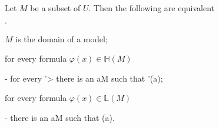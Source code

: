 \documentclass[11pt,oneside]{amsart}
\newcommand{\mylabel}[1]{{#1}\hfill}
\renewenvironment{itemize}
  {\begin{list}{$\cdot$}{%
  \setlength{\parskip}{0mm}
  \setlength{\topsep}{.2\baselineskip}
  \setlength{\rightmargin}{0mm}
  \setlength{\listparindent}{0mm}
  \setlength{\itemindent}{0mm}
  \setlength{\labelwidth}{3ex}
  \setlength{\itemsep}{.2\baselineskip}
  \setlength{\parsep}{.2\baselineskip}
  \setlength{\partopsep}{0mm}
  \setlength{\labelsep}{1ex}
  \setlength{\leftmargin}{\labelwidth+\labelsep}
  \let\makelabel\mylabel}}{%
\end{list}}
\begin{document}
\begin{proposition} 
  Let $M$ be a subset of $U$.
  Then the following are equivalent
  \begin{itemize}
    \item[1.] $M$ is the domain of a model;
    \item[2.] for every formula $\varphi(x)\in\mathds{H}(M)$
    
    \noindent\kern-\leftmargin
    {\textrm{ for every }\varphi'>\varphi\textrm{ there is an }a\in M\textrm{ such that }\varphi'(a);}
    \item[3.] for every formula $\varphi(x)\in\mathds{L}(M)$
    
    \noindent\kern-\leftmargin
    {\textrm{ there is an }a\in M\textrm{ such that }\neg\varphi(a).}
    
  \end{itemize}
\end{proposition}
\end{document}
